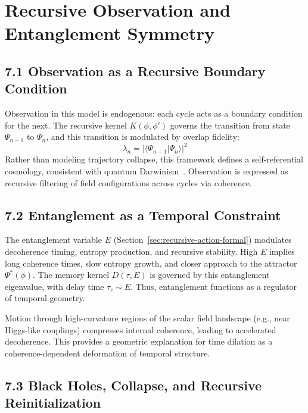 \section{Recursive Observation and Entanglement Symmetry}
\label{sec:recursive-observation}

\subsection{7.1 Observation as a Recursive Boundary Condition}

Observation in this model is endogenous: each cycle acts as a boundary condition for the next. The recursive kernel \( K(\phi, \phi') \) governs the transition from state \( \Psi_{n-1} \) to \( \Psi_n \), and this transition is modulated by overlap fidelity:
\[
\lambda_n = |\langle \Psi_{n-1} | \Psi_n \rangle|^2
\]
Rather than modeling trajectory collapse, this framework defines a self-referential cosmology, consistent with quantum Darwinism~\cite{zurek_environment-induced_2003,zurek_quantum_2009}. Observation is expressed as recursive filtering of field configurations across cycles via coherence.

\subsection{7.2 Entanglement as a Temporal Constraint}

The entanglement variable \( E \) (Section~\ref{sec:recursive-action-formal}) modulates decoherence timing, entropy production, and recursive stability. High \( E \) implies long coherence times, slow entropy growth, and closer approach to the attractor \( \Psi^*(\phi) \). The memory kernel \( D(\tau, E) \) is governed by this entanglement eigenvalue, with delay time \( \tau_c \sim E \). Thus, entanglement functions as a regulator of temporal geometry.

Motion through high-curvature regions of the scalar field landscape (e.g., near Higgs-like couplings) compresses internal coherence, leading to accelerated decoherence. This provides a geometric explanation for time dilation as a coherence-dependent deformation of temporal structure.

\subsection{7.3 Black Holes, Collapse, and Recursive Reinitialization}

